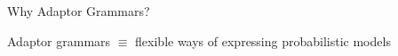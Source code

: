 


\begin{frame}{Why Adaptor Grammars?}
  \begin{center}
      Adaptor grammars $\equiv$ flexible ways of expressing
      probabilistic models
    \vspace{2mm}

    \pause


\end{center}
\end{frame}
